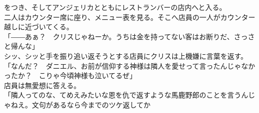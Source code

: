 \documentclass[b5j,10pt,openany]{jsbook}
\begin{document}
をつき、そしてアンジェリカとともにレストランバーの店内へと入る。\\二人はカウンター席に座り、メニュー表を見る。そこへ店員の一人がカウンター越しに近づいてくる。\\「――あぁ？　クリスじゃねーか。うちは金を持ってない客はお断りだ、さっさと帰んな」\\シッ、シッと手を振り追い返そうとする店員にクリスは上機嫌に言葉を返す。\\「なんだ？　ダニエル、お前が信仰する神様は隣人を愛せって言ったんじゃなかったか？　こりゃ今頃神様も泣いてるぜ」\\店員は無愛想に答える。\\「隣人ってのな、てめえみたいな恩を仇で返すような馬鹿野郎のことを言うんじゃねえ。文句があるなら今までのツケ返してか
\end{document}
